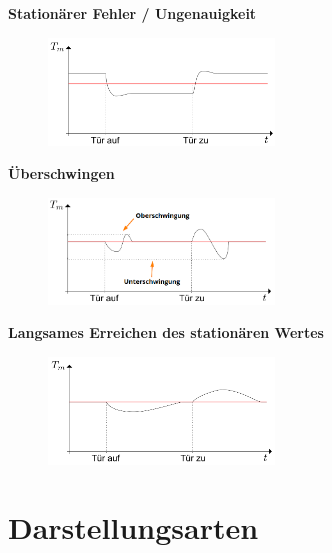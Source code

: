 \documentclass[
  10pt,
  a4paper,
  twocolumn]{article}
\numberwithin{equation}{section}
\begin{document}
\textbf{Stationärer Fehler / Ungenauigkeit}

\begin{figure}[H]

{\centering \includegraphics[width=6cm,height=\textheight]{images/storverhalten/storverhalten_stationary.png}

}

\end{figure}

\textbf{Überschwingen}

\begin{figure}[H]

{\centering \includegraphics[width=6cm,height=\textheight]{images/storverhalten/uber_unterschwingung.png}

}

\end{figure}

\textbf{Langsames Erreichen des stationären Wertes}

\begin{figure}[H]

{\centering \includegraphics[width=6cm,height=\textheight]{images/storverhalten/slow.png}

}

\end{figure}

\hypertarget{darstellungsarten}{%
\section{Darstellungsarten}\label{darstellungsarten}}
\end{document}
